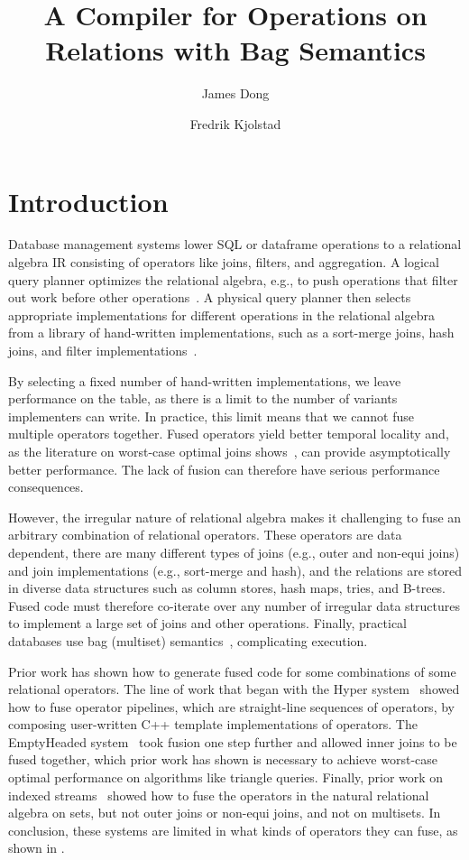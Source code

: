 \documentclass[acmsmall,screen,nonacm]{acmart}\settopmatter{printfolios=true,printccs=false,printacmref=false}
\title{A Compiler for Operations on Relations with Bag Semantics}
\author{James Dong}
\affiliation{%
  \institution{Stanford University}
  \streetaddress{450 Jane Stanford Way}
  \city{Stanford}
  \state{CA}
  \postcode{94305}
  \country{USA}}
\author{Fredrik Kjolstad}
\affiliation{%
  \institution{Stanford University}
  \streetaddress{450 Jane Stanford Way}
  \city{Stanford}
  \state{CA}
  \postcode{94305}
  \country{USA}}
\begin{document}
\maketitle

\section{Introduction}
\label{sec:introduction}

Database management systems lower SQL or dataframe operations to a relational algebra IR consisting of operators like joins, filters, and aggregation. A logical query planner optimizes the relational algebra, e.g., to push operations that filter out work before other operations~\cite{architecture-db,overview-query-opt}. A physical query planner then selects appropriate implementations for different operations in the relational algebra from a library of hand-written implementations, such as a sort-merge joins, hash joins, and filter implementations~\cite{dbs-complete-book}.

By selecting a fixed number of hand-written implementations, we leave performance on the table, as there is a limit to the number of variants implementers can write. In practice, this limit means that we cannot fuse multiple operators together. Fused operators yield better temporal locality and, as the literature on worst-case optimal joins shows~\cite{ngo-skew}, can provide asymptotically better performance. The lack of fusion can therefore have serious performance consequences.

However, the irregular nature of relational algebra makes it challenging to fuse an arbitrary combination of relational operators. These operators are data dependent, there are many different types of joins (e.g., outer and non-equi joins) and join implementations (e.g., sort-merge and hash), and the relations are stored in diverse data structures such as column stores, hash maps, tries, and B-trees. Fused code must therefore co-iterate over any number of irregular data structures to implement a large set of joins and other operations. Finally, practical databases use bag (multiset) semantics~\cite{on-multisets-in-dbs,multiset-ra,multiset-table-algebra}, complicating execution.

Prior work has shown how to generate fused code for some combinations of some relational operators. The line of work that began with the Hyper system~\cite{hyper} showed how to fuse operator pipelines, which are straight-line sequences of operators, by composing user-written C++ template implementations of operators. The EmptyHeaded system~\cite{emptyheaded} took fusion one step further and allowed inner joins to be fused together, which prior work has shown is necessary to achieve worst-case optimal performance on algorithms like triangle queries. Finally, prior work on indexed streams~\cite{indexed-streams} showed how to fuse the operators in the natural relational algebra on sets, but not outer joins or non-equi joins, and not on multisets. In conclusion, these systems are limited in what kinds of operators they can fuse, as shown in .
\end{document}
